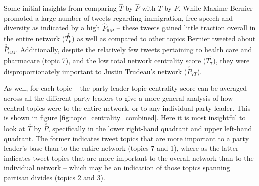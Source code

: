 Some initial insights from comparing \textbf{$\hat{T}$} by \textbf{$\hat{P}$}
with \textbf{$\overline{T}$} by \textbf{$\overline{P}$}. While Maxime Bernier
promoted a large number of tweets regarding immigration, free speech and
diversity as indicated by a high $\hat{P}_{6M}$ -- these tweets gained little
traction overall in the entire network ($\stackrel{z}{T_{6}}$) as well as compared to
other topics Bernier tweeted about $\stackrel{z}{P}_{6M}$. Additionally, despite
the relatively few tweets pertaining to health care and pharmacare (topic 7),
and the low total network centrality score ($\stackrel{z}{T_{7}}$), they were
disproportionately important to Justin Trudeau's network
($\stackrel{z}{P}_{7T}$).

As well, for each topic -- the party leader topic centrality score can be
averaged across all the different party leaders to give a more general analysis
of how central topics were to the entire network, or to any individual party leader.
This is shown in figure \ref{fig:topic_centrality_combined}. Here it is most
insightful to look at \textbf{$\stackrel{z}{T}$} by \textbf{$\stackrel{z}{P}$},
specifically in the lower right-hand quadrant and upper left-hand quadrant. The
former indicates tweet topics that are more important to a party leader's base than to the
entire network (topics 7 and 1), where as the latter indicates tweet topics that
are more important to the overall network than to the individual network --
which may be an indication of those topics spanning partisan divides (topics 2
and 3).

